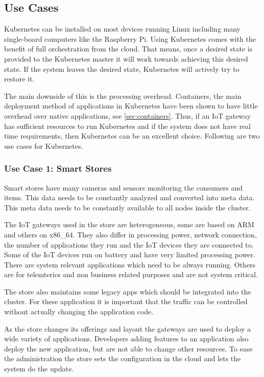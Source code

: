 \subsection{Use Cases}
Kubernetes can be installed on most devices running Linux including many single-board computers like the Raspberry Pi. Using Kubernetes comes with the benefit of full orchestration from the cloud. That means, once a desired state is provided to the Kubernetes master it will work towards achieving this desired state. If the system leaves the desired state, Kubernetes will actively try to restore it. 

The main downside of this is the processing overhead. Containers, the main deployment method of applications in Kubernetes have been shown to have little overhead over native applications, see \cref{sec:containers}. Thus, if an IoT gateway has sufficient resources to run Kubernetes and if the system does not have real time requirements, then Kubernetes can be an excellent choice. Following are two use cases for Kubernetes.


\subsubsection{Use Case 1: Smart Stores}
Smart stores have many cameras and sensors monitoring the consumers and items. This data needs to be constantly analyzed and converted into meta data. This meta data needs to be constantly available to all nodes inside the cluster.

The IoT gateways used in the store are heterogeneous, some are based on ARM and others on x86\_64. They also differ in processing power, network connection, the number of applications they run and the IoT devices they are connected to. Some of the IoT devices run on battery and have very limited processing power. There are system relevant applications which need to be always running. Others are for telemterics and non business related purposes and are not system critical.

The store also maintains some legacy apps which should be integrated into the cluster. For these application it is important that the traffic can be controlled without actually changing the application code.

As the store changes its offerings and layout the gateways are used to deploy a wide variety of  applications. Developers adding features to an application also deploy the new application, but are not able to change other resources. To ease the administration the store sets the configuration in the cloud and lets the system do the update. 

